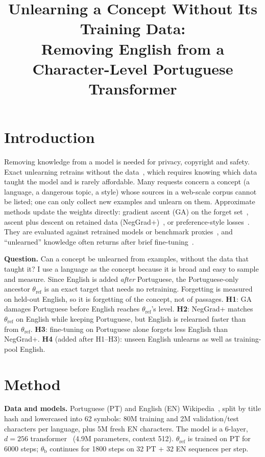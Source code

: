 \documentclass[conference]{IEEEtran}
\newcommand{\tref}{\theta_{\text{ref}}}
\newcommand{\tb}{\theta_{\text{b}}}
\begin{document}
\title{Unlearning a Concept Without Its Training Data:\\Removing English from a Character-Level Portuguese Transformer}

\author{
}

\maketitle

\section{Introduction}
Removing knowledge from a model is needed for privacy, copyright and safety. Exact unlearning retrains without the data~\cite{bourtoule2021}, which requires knowing which data taught the model and is rarely affordable. Many requests concern a concept (a language, a dangerous topic, a style) whose sources in a web-scale corpus cannot be listed; one can only collect new examples and unlearn on them. Approximate methods update the weights directly: gradient ascent (GA) on the forget set~\cite{jang2023}, ascent plus descent on retained data (NegGrad+)~\cite{kurmanji2023}, or preference-style losses~\cite{zhang2024npo}. They are evaluated against retrained models or benchmark proxies~\cite{maini2024tofu}, and ``unlearned'' knowledge often returns after brief fine-tuning~\cite{lynch2024eight}.

\textbf{Question.} Can a concept be unlearned from examples, without the data that taught it? I use a language as the concept because it is broad and easy to sample and measure. Since English is added \emph{after} Portuguese, the Portuguese-only ancestor $\tref$ is an exact target that needs no retraining. Forgetting is measured on held-out English, so it is forgetting of the concept, not of passages. \textbf{H1}: GA damages Portuguese before English reaches $\tref$'s level. \textbf{H2}: NegGrad+ matches $\tref$ on English while keeping Portuguese, but English is relearned faster than from $\tref$. \textbf{H3}: fine-tuning on Portuguese alone forgets less English than NegGrad+. \textbf{H4} (added after H1--H3): unseen English unlearns as well as training-pool English.

\section{Method}
\textbf{Data and models.} Portuguese (PT) and English (EN) Wikipedia~\cite{wikipedia}, split by title hash and lowercased into 62 symbols: 80M training and 2M validation/test characters per language, plus 5M fresh EN characters. The model is a 6-layer, $d{=}256$ transformer~\cite{vaswani2017,nanogpt} (4.9M parameters, context 512). $\tref$ is trained on PT for 6000 steps; $\tb$ continues for 1800 steps on 32 PT + 32 EN sequences per step.
\end{document}
